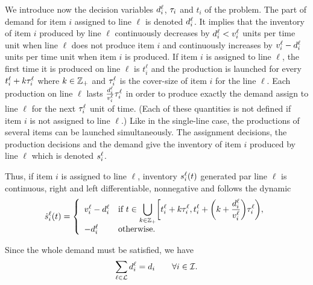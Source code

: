 We introduce now the decision variables $d_i^{\ell}$, $\tau_i$ and $t_i$ of the problem.
The part of demand for item $i$ assigned to line $\ell$ is denoted $d_i^{\ell}$.
It implies that the inventory of item $i$ produced by line $\ell$  continuously decreases by $d_i^{\ell}<v_i^{\ell}$ units per time unit when line $\ell$ does not produce item $i$ and continuously increases by $v_i^{\ell}-d_i^{\ell}$ units per time unit when item $i$ is produced.
If item $i$ is assigned to line $\ell$, the first time it is produced on line $\ell$ is $t_i^{\ell}$ and the production is launched for every $t_i^{\ell}+k\tau_i^{\ell}$ where $k\in\mathbb{Z}_+$ and $\tau_i^{\ell}$ is the cover-size of item $i$ for the line $\ell$.
Each production on line $\ell$ lasts $\frac{d_i^{\ell}}{v_i^{\ell}}\tau_i^{\ell}$ in order to produce exactly the demand assign to line $\ell$ for the next $\tau_i^{\ell}$ unit of time.
(Each of these quantities is not defined if item $i$ is not assigned to line $\ell$.)
Like in the single-line case, the productions of several items can be launched simultaneously.
The assignment decisions, the production decisions and the demand give the inventory of item $i$ produced by line $\ell$ which is denoted $s_i^{\ell}$.



Thus, if item $i$ is assigned to line $\ell$, inventory $\inventory_i^{\ell}\bracket{t}$ generated par line $\ell$ is continuous, right and left differentiable, nonnegative and follows the dynamic
\begin{equation}\label{eq:lot-size:multi-line:motivations:dynamic}
  \dot{\inventory}_i^{\ell}\bracket{t} =
  \left\{
  \begin{array}{ll}
  \rate_i^{\ell}-\demand_i^{\ell}
  & \ds\mbox{if}\ t\in\bigcup_{k\in\ZZ_+} \left[t_i^{\ell}+k\cover_i^{\ell},t_i^{\ell}+\bracket{k+\frac{\demand_i^{\ell}}{\rate_i^{\ell}}}\cover_i^{\ell}\right),
  \\
  -\demand_i^{\ell}
  & \mbox{otherwise}.
  \end{array}
  \right.
\end{equation}


Since the whole demand must be satisfied, we have
\begin{equation}\label{eq:lot-size:multi-line:motivations:whole-demand}
  \sum_{\ell\in\mathcal{L}}d_i^{\ell}=d_i\qquad\forall i\in\mathcal{I}.
\end{equation}


